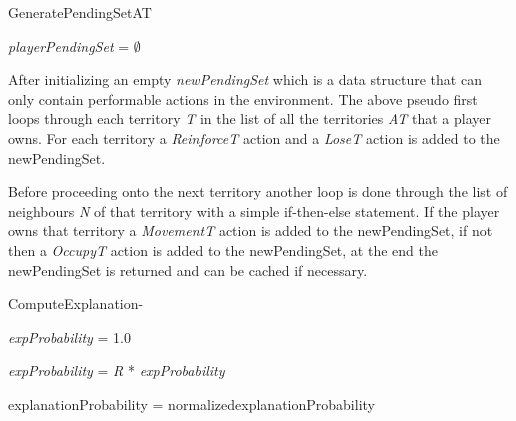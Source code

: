 \documentclass[parskip]{cs4rep}
\begin{document}
\begin{pseudocode}[ruled]{GeneratePendingSet}{AT}
\begin{algorithm}[H]
\textit{playerPendingSet} = $\emptyset$

\end{algorithm}
\end{pseudocode}

After initializing an empty \textit{newPendingSet} which is a data structure that can only contain performable actions in the environment. The above pseudo first loops through each territory \textit{T} in the list of all the territories \textit{AT} that a player owns. For each territory a \textit{ReinforceT} action and a \textit{LoseT} action is added to the newPendingSet. 

Before proceeding onto the next territory another loop is done through the list of neighbours \textit{N} of that territory with a simple if-then-else statement. If the player owns that territory a \textit{MovementT} action is added to the newPendingSet, if not then a \textit{OccupyT} action is added to the newPendingSet, at the end the newPendingSet is returned and can be cached if necessary.

\begin{pseudocode}[ruled]{ComputeExplanation}{-}
\begin{algorithm}[H]

\textit{expProbability} = 1.0

\textit{expProbability} = \textit{R} * \textit{expProbability}	


explanationProbability = normalized{explanationProbability}

\end{algorithm}
\end{pseudocode}
\end{document}
